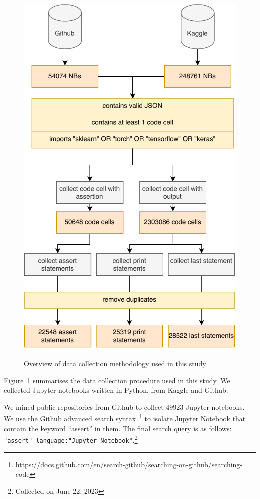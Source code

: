\begin{figure}
\centering
\includegraphics[width=\linewidth]{data-collection.pdf}
\label{fig:data-collection}
\caption{Overview of data collection methodology used in this study}
\end{figure}

Figure~\ref{fig:data-collection} summarises the data collection procedure used in this study. We collected Jupyter notebooks written in Python, from Kaggle and Github. 

We mined public repositories from Github to collect $49923$ Jupyter notebooks. We use the Github advanced search syntax~\footnote{https://docs.github.com/en/search-github/searching-on-github/searching-code} to isolate Jupyter Notebook that contain the keyword ``assert'' in them. The final search query is as follows: \texttt{"assert" language:"Jupyter Notebook"}.\footnote{Collected on June 22, 2023}

